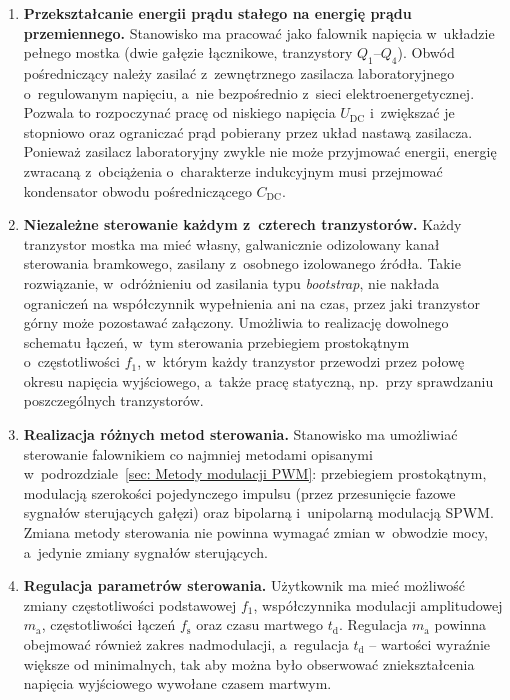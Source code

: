 \begin{enumerate}[label=\textbf{F\arabic*.}, leftmargin=*, itemsep=4pt]

  \item \textbf{Przekształcanie energii prądu stałego na energię prądu
    przemiennego.} Stanowisko ma pracować jako falownik napięcia w~układzie
    pełnego mostka (dwie gałęzie łącznikowe, tranzystory $Q_1$--$Q_4$).
    Obwód pośredniczący należy zasilać z~zewnętrznego zasilacza
    laboratoryjnego o~regulowanym napięciu, a~nie bezpośrednio z~sieci
    elektroenergetycznej. Pozwala to rozpoczynać pracę od niskiego napięcia
    $U_\mathrm{DC}$ i~zwiększać je stopniowo oraz ograniczać prąd pobierany
    przez układ nastawą zasilacza. Ponieważ zasilacz laboratoryjny zwykle
    nie może przyjmować energii, energię zwracaną z~obciążenia
    o~charakterze indukcyjnym musi przejmować kondensator obwodu
    pośredniczącego $C_\mathrm{DC}$.

  \item \textbf{Niezależne sterowanie każdym z~czterech tranzystorów.}
    Każdy tranzystor mostka ma mieć własny, galwanicznie odizolowany kanał
    sterowania bramkowego, zasilany z~osobnego izolowanego źródła. Takie
    rozwiązanie, w~odróżnieniu od zasilania typu \textit{bootstrap}, nie
    nakłada ograniczeń na współczynnik wypełnienia ani na czas, przez jaki
    tranzystor górny może pozostawać załączony. Umożliwia to realizację
    dowolnego schematu łączeń, w~tym sterowania przebiegiem prostokątnym
    o~częstotliwości $f_1$, w~którym każdy tranzystor przewodzi przez
    połowę okresu napięcia wyjściowego, a~także pracę statyczną, np.~przy
    sprawdzaniu poszczególnych tranzystorów.

  \item \textbf{Realizacja różnych metod sterowania.} Stanowisko ma
    umożliwiać sterowanie falownikiem co najmniej metodami opisanymi
    w~podrozdziale~\ref{sec: Metody modulacji PWM}: przebiegiem
    prostokątnym, modulacją szerokości pojedynczego impulsu (przez
    przesunięcie fazowe sygnałów sterujących gałęzi) oraz bipolarną
    i~unipolarną modulacją SPWM. Zmiana metody sterowania nie powinna
    wymagać zmian w~obwodzie mocy, a~jedynie zmiany sygnałów sterujących.

  \item \textbf{Regulacja parametrów sterowania.} Użytkownik ma mieć
    możliwość zmiany częstotliwości podstawowej $f_1$, współczynnika
    modulacji amplitudowej $m_\mathrm{a}$, częstotliwości łączeń
    $f_\mathrm{s}$ oraz czasu martwego $t_\mathrm{d}$. Regulacja
    $m_\mathrm{a}$ powinna obejmować również zakres nadmodulacji, a~regulacja
    $t_\mathrm{d}$ -- wartości wyraźnie większe od minimalnych, tak aby
    można było obserwować zniekształcenia napięcia wyjściowego wywołane
    czasem martwym.


\end{enumerate}
